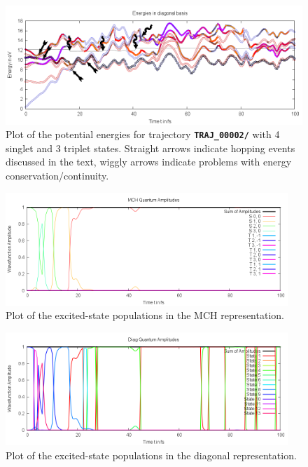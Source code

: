 \documentclass[a4paper,11pt,DIV=15,openany]{scrbook}
\newcommand{\ttt}[1]{\textbf{\texttt{#1}}}
\begin{document}
\begin{figure}[tb]
  \centering
  \includegraphics[width=\textwidth]{figures/energy.png}
  \caption{Plot of the potential energies for trajectory \ttt{TRAJ\_00002/} with 4 singlet and 3 triplet states. Straight arrows indicate hopping events discussed in the text, wiggly arrows indicate problems with energy conservation/continuity. }
  \label{fig:en}
\end{figure}
\begin{figure}[p]
  \centering
  \includegraphics[width=0.95\textwidth]{figures/coeff_MCH.png}
  \caption{Plot of the excited-state populations in the MCH representation.}
  \label{fig:cMCH}
\end{figure}
\begin{figure}[p]
  \centering
  \includegraphics[width=0.95\textwidth]{figures/coeff_diag.png}
  \caption{Plot of the excited-state populations in the diagonal representation.}
  \label{fig:cDIAG}
\end{figure}
\end{document}
